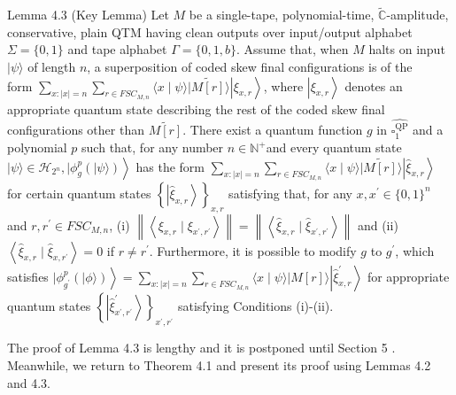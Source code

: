 \documentclass[10pt]{article}
\begin{document}
Lemma 4.3 (Key Lemma) Let $M$ be a single-tape, polynomial-time, $\tilde{\mathbb{C}}$-amplitude, conservative, plain QTM having clean outputs over input/output alphabet $\Sigma=\{0,1\}$ and tape alphabet $\Gamma=\{0,1, b\}$. Assume that, when $M$ halts on input $|\psi\rangle$ of length $n$, a superposition of coded skew final configurations is of the\\
form $\sum_{x:|x|=n} \sum_{r \in F S C_{M, n}}\langle x \mid \psi\rangle|\widetilde{M[r]}\rangle\left|\xi_{x, r}\right\rangle$, where $\left|\xi_{x, r}\right\rangle$ denotes an appropriate quantum state describing the rest of the coded skew final configurations other than $\widetilde{M[r]}$. There exist a quantum function $g$ in $\widehat{\square_{1}^{\mathrm{QP}}}$ and a polynomial $p$ such that, for any number $n \in \mathbb{N}^{+}$and every quantum state $\left.|\psi\rangle \in \mathcal{H}_{2^{n}}, \mid \phi_{g}^{p}(|\psi\rangle)\right\rangle$ has the form $\sum_{x:|x|=n} \sum_{r \in F S C_{M, n}}\langle x \mid \psi\rangle|\widetilde{M[r]}\rangle\left|\widehat{\xi}_{x, r}\right\rangle$ for certain quantum states $\left\{\left|\widehat{\xi}_{x, r}\right\rangle\right\}_{x, r}$ satisfying that, for any $x, x^{\prime} \in\{0,1\}^{n}$ and $r, r^{\prime} \in F S C_{M, n}$, (i) $\left\|\left\langle\xi_{x, r} \mid \xi_{x^{\prime}, r^{\prime}}\right\rangle\right\|=\left\|\left\langle\widehat{\xi}_{x, r} \mid \widehat{\xi}_{x^{\prime}, r^{\prime}}\right\rangle\right\|$ and (ii) $\left\langle\widehat{\xi}_{x, r} \mid \widehat{\xi}_{x, r^{\prime}}\right\rangle=0$ if $r \neq r^{\prime}$. Furthermore, it is possible to modify $g$ to $g^{\prime}$, which satisfies $\left.\mid \phi_{g^{\prime}}^{p}(|\phi\rangle)\right\rangle=\sum_{x:|x|=n} \sum_{r \in F S C_{M, n}}\langle x \mid \psi\rangle|M[r]\rangle\left|\widehat{\xi}_{x, r}^{\prime}\right\rangle$ for appropriate quantum states $\left\{\left|\widehat{\xi}_{x^{\prime}, r^{\prime}}^{\prime}\right\rangle\right\}_{x^{\prime}, r^{\prime}}$ satisfying Conditions (i)-(ii).

The proof of Lemma 4.3 is lengthy and it is postponed until Section 5 . Meanwhile, we return to Theorem 4.1 and present its proof using Lemmas 4.2 and 4.3.
\end{document}
